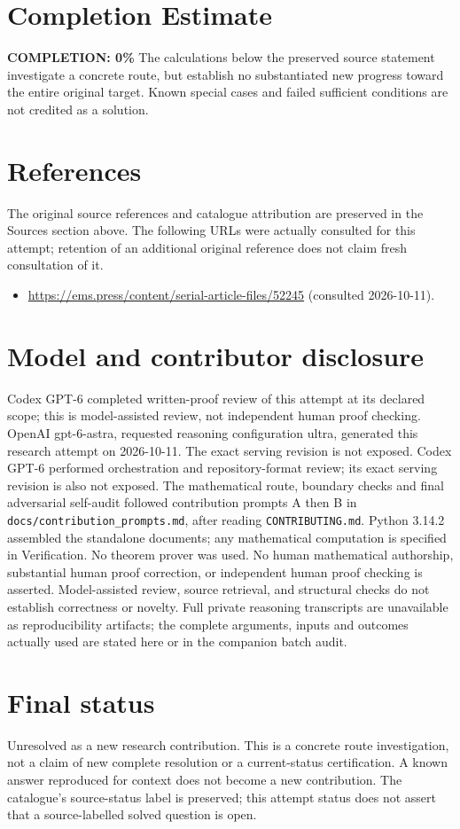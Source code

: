 \documentclass[11pt]{article}
\begin{document}
\section{Completion Estimate}
\noindent\textbf{COMPLETION: 0\%}
The calculations below the preserved source statement investigate a concrete route,
but establish no substantiated new progress toward the entire original target.
Known special cases and failed sufficient conditions are not credited as a solution.
\section{References}
The original source references and catalogue attribution are preserved in the
Sources section above. The following URLs were actually consulted for this attempt;
retention of an additional original reference does not claim fresh consultation of it.
\begin{itemize}
\item \url{https://ems.press/content/serial-article-files/52245} (consulted 2026-10-11). 
\end{itemize}
\section{Model and contributor disclosure}
Codex GPT-6 completed written-proof review of this attempt at its declared scope; this is model-assisted review, not independent human proof checking.
OpenAI gpt-6-astra, requested reasoning configuration ultra, generated this research
attempt on 2026-10-11. The exact serving revision is not exposed. Codex GPT-6
performed orchestration and repository-format review; its exact serving revision
is also not exposed. The mathematical route, boundary checks and final adversarial
self-audit followed contribution prompts A then B in
\texttt{docs/contribution\_prompts.md}, after reading \texttt{CONTRIBUTING.md}.
Python 3.14.2 assembled the standalone documents; any mathematical computation is
specified in Verification. No theorem prover was used. No human mathematical
authorship, substantial human proof correction, or independent human proof checking
is asserted. Model-assisted review, source retrieval, and structural checks do not
establish correctness or novelty. Full private reasoning transcripts are unavailable
as reproducibility artifacts; the complete arguments, inputs and outcomes actually
used are stated here or in the companion batch audit.
\section{Final status}
Unresolved as a new research contribution. This is a concrete route investigation,
not a claim of new complete resolution or a current-status certification. A known
answer reproduced for context does not become a new contribution. The catalogue's
source-status label is preserved; this attempt status does not assert that a
source-labelled solved question is open.
\end{document}
